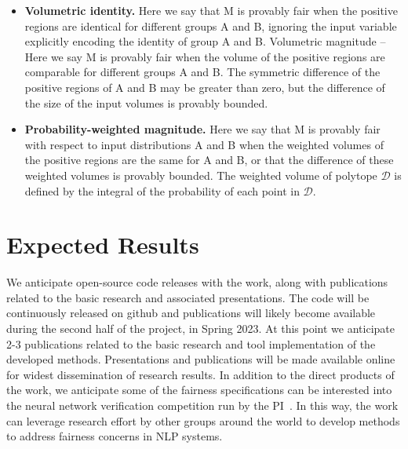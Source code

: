 \documentclass[11pt]{article}
\begin{document}
\begin{itemize}
\item \textbf{Volumetric identity.}  Here we say that M is provably fair when the positive regions are identical for different groups A and B, ignoring the input variable explicitly encoding the identity of group A and B.
Volumetric magnitude – Here we say M is provably fair when the volume of the positive regions are comparable for different groups A and B.   The symmetric difference of the positive regions of A and B may be greater than zero, but the difference of the size of the input volumes is provably bounded.
%
\item \textbf{Probability-weighted magnitude.}  Here we say that M is provably fair with respect to input distributions A and B when the weighted volumes of the positive regions are the same for A and B, or that the difference of these weighted volumes is provably bounded.  The weighted volume of polytope $\mathcal{D}$ is defined by the integral of the probability of each point in $\mathcal{D}$.
\end{itemize}



\section*{Expected Results}
We anticipate open-source code releases with the work, along with publications related to the basic research and associated presentations.
%
The code will be continuously released on github and publications will likely become available during the second half of the project, in Spring 2023.
%
At this point we anticipate 2-3 publications related to the basic research and tool implementation of the developed methods.
%
Presentations and publications will be made available online for widest dissemination of research results.
%
In addition to the direct products of the work, we anticipate some of the fairness specifications can be interested into the neural network verification competition run by the PI~\cite{vnncomp2021}.
%
In this way, the work can leverage research effort by other groups around the world to develop methods to address fairness concerns in NLP systems.
\end{document}
